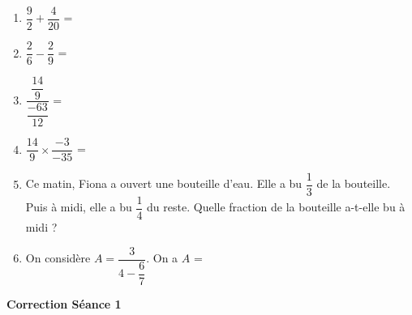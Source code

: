 \documentclass[a4paper,11pt]{article}
\begin{document}
\begin{seanceD}{} %

\begin{enumerate}
\item $\dfrac{9}{2}+\dfrac{4}{20}$ = \dotfill

\item $\dfrac{2}{6}-\dfrac{2}{9}$ = \dotfill

\item $\dfrac{\dfrac{14}{9}}{\dfrac{-63}{12}}$ = \dotfill

\item $\dfrac{14}{9}\times\dfrac{-3}{-35}$ = \dotfill

\item Ce matin, Fiona a ouvert une bouteille d'eau. Elle a bu $\dfrac{1}{3}$ de la bouteille. \\
Puis à midi, elle a bu $\dfrac{1}{4}$ du reste. Quelle fraction de la bouteille a-t-elle bu à midi ?

\dotfill

\item On considère $A=\dfrac{3}{4-\dfrac{6}{7}}$. On a $A$ = \dotfill

\end{enumerate}

\end{seanceD} 
\vspace{0.5cm}
\begin{center}

\textbf{\textcolor{Couleur8}{Correction Séance 1}}\\
\vspace{2mm}

\end{center}
\end{document}
